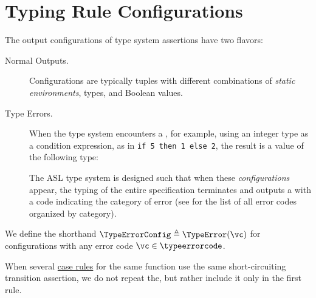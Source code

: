 \section{Typing Rule Configurations\label{sec:Typing Rule Configurations}}
The output configurations of type system assertions have two flavors:
\begin{description}
  \item[Normal Outputs.]
  Configurations are typically tuples with different combinations
  of \emph{static environments}, types, and Boolean values.

  \item[Type Errors.] When the type system encounters a \typingerrorterm{},
  for example, using an integer type as a condition expression, as in \verb|if 5 then 1 else 2|,
  the result is a value of the following type:

  The ASL type system is designed such that when these \emph{\typingerrorterm{} configurations} appear,
  the typing of the entire specification terminates and outputs a \typingerrorterm{} with a code indicating
  the category of error (see  for the list of all error codes organized by category).
\end{description}

\BackupOriginalType{
\[
  \typeerror \triangleq \{\TypeErrorVal{\vs} \;|\; \vs \in \Strings \}
\]
}
\hypertarget{type-TypeErrorconfig}{}
We define the shorthand $\TypeErrorConfig \triangleq \TypeError(\vc)$ for \typingerrorterm{} configurations
with any error code $\vc \in \typeerrorcode$.

When several \hyperlink{def-caserules}{case rules} for the same function use the same short-circuiting transition assertion,
we do not repeat the\ProseOrTypeError, but rather include it only in the first rule.
